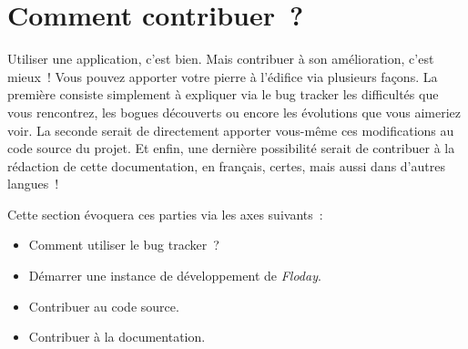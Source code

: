 \section{Comment contribuer~?}
	\begin{intro}
	Utiliser une application, c'est bien. Mais contribuer à son amélioration, c'est mieux~!
	Vous pouvez apporter votre pierre à l'édifice via plusieurs façons.
	La première consiste simplement à expliquer via le bug tracker les difficultés que vous rencontrez, les bogues découverts ou encore les évolutions que vous aimeriez voir.
	La seconde serait de directement apporter vous-même ces modifications au code source du projet.
	Et enfin, une dernière possibilité serait de contribuer à la rédaction de cette documentation, en français, certes, mais aussi dans d'autres langues~!

	Cette section évoquera ces parties via les axes suivants~:
	\begin{itemize}
		\item Comment utiliser le bug tracker~?
		\item Démarrer une instance de développement de \emph{Floday}.
		\item Contribuer au code source.
		\item Contribuer à la documentation.
	\end{itemize}
\end{intro}





